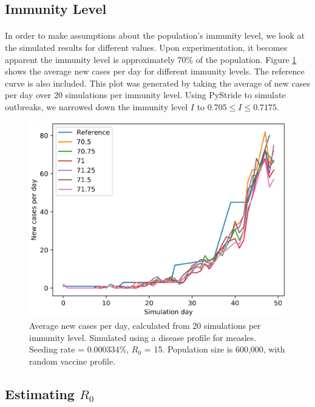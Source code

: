 \documentclass[runningheads]{llncs}
\begin{document}
\subsection{Immunity Level}

\paragraph{} In order to make assumptions about the population's immunity level, we look at the simulated results for different values. Upon experimentation, it becomes apparent the immunity level is approximately 70\% of the population. Figure \ref{immLvlPlot} shows the average new cases per day for different immunity levels. The reference curve is also included. This plot was generated by taking the average of new cases per day over 20 simulations per immunity level. Using PyStride to simulate outbreaks, we narrowed down the immunity level $I$ to \( 0.705 \leq I \leq 0.7175 \).

\begin{figure}[H]
\includegraphics[width=\textwidth]{ImmLvl.eps}
\caption{Average new cases per day, calculated from 20 simulations per immunity level. Simulated using a disease profile for measles. Seeding rate = $0.000334$\%, $R_0$ = 15. Population size is 600,000, with random vaccine profile.} 
\label{immLvlPlot}
\end{figure}


\subsection{Estimating $R_{0}$}
\end{document}
